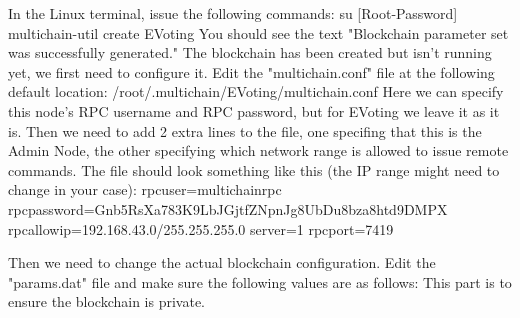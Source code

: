 \documentclass[11pt]{article}
\begin{document}
	In the Linux terminal, issue the following commands:\newline\newline
	su [Root-Password]\newline
	multichain-util create EVoting\newline\newline
	You should see the text "Blockchain parameter set was successfully generated."\newline
	The blockchain has been created but isn't running yet, we first need to configure it.\newline
	Edit the "multichain.conf" file at the following default location:\newline
	/root/.multichain/EVoting/multichain.conf\newline
	Here we can specify this node's RPC username and RPC password, but for EVoting we leave it as it is. Then we need to add 2 extra lines to the file, one specifing that this is the Admin Node, the other specifying which network range is allowed to issue remote commands. The file should look something like this (the IP range might need to change in your case):\newline
	rpcuser=multichainrpc\newline
	rpcpassword=Gnb5RsXa783K9LbJGjtfZNpnJg8UbDu8bza8htd9DMPX\newline
	rpcallowip=192.168.43.0/255.255.255.0\newline
	server=1\newline
	rpcport=7419\newline\newline
	
	Then we need to change the actual blockchain configuration. Edit the "params.dat" file and make sure the following values are as follows:\newline\newline\newline
	This part is to ensure the blockchain is private.\newline
	
\end{document}
